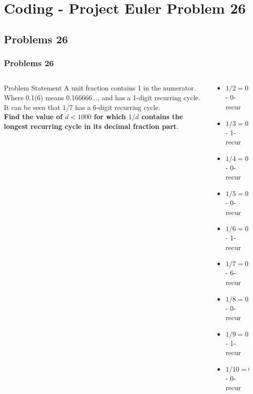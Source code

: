 \section{Coding - Project Euler Problem 26}
\frame{\sectionpage}

	\subsection{Problems 26}
	
	\begin{frame}[fragile]\frametitle{Problems 26}


	\begin{columns}[T] %
			\begin{column}{.52\textwidth}
\begin{block}{Problem Statement}
				A unit fraction contains 1 in the numerator.
				Where 0.1(6) means 0.166666..., and has a 1-digit recurring cycle. It can be
				seen that 1/7 has a 6-digit recurring cycle.\hfill \\
\textbf{Find the value of $d < 1000$ for which $1/d$ contains the longest recurring
			cycle in its decimal fraction part}.
\end{block}	
			\end{column}%
				\begin{column}{.48\textwidth}
				\begin{itemize}
				  \item $1/2 =  0.5$ - 0-recur
				  \item  $1/3 =  0.(3)$ - 1-recur
				  \item $1/4 =  0.25$ - 0-recur
				  \item $1/5 =  0.2$ - 0-recur
				  \item $1/6 =  0.1(6)$ - 1-recur
				  \item $1/7 =  0.(142857)$ - 6-recur
				  \item $1/8 =  0.125$ - 0-recur
				  \item $1/9 =  0.(1)$ - 1-recur 
				  \item $1/10 =  0.1$ - 0-recur
				\end{itemize}
			\end{column}%
		\end{columns}
	\end{frame}
	
